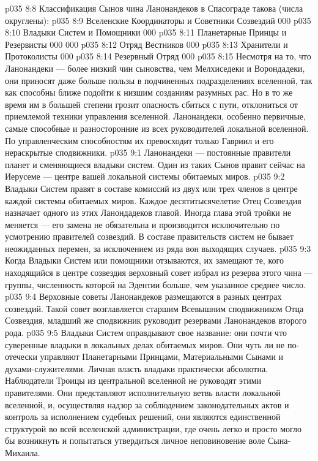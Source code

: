 \vs p035 8:8 Классификация Сынов чина Ланонандеков в Спасограде такова (числа округлены):
\vs p035 8:9 \pc Вселенские Координаторы и Советники Созвездий 000
\vs p035 8:10 Владыки Систем и Помощники 000
\vs p035 8:11 Планетарные Принцы и Резервисты 000 000
\vs p035 8:12 Отряд Вестников 000
\vs p035 8:13 Хранители и Протоколисты 000
\vs p035 8:14 Резервный Отряд 000
\vs p035 8:15 \pc Несмотря на то, что Ланонандеки --- более низкий чин сыновства, чем Мелхиседеки и Ворондадеки, они приносят даже больше пользы в подчиненных подразделениях вселенной, так как способны ближе подойти к низшим созданиям разумных рас. Но в то же время им в большей степени грозит опасность сбиться с пути, отклониться от приемлемой техники управления вселенной. Ланонандеки, особенно первичные, самые способные и разносторонние из всех руководителей локальной вселенной. По управленческим способностям их превосходит только Гавриил и его нераскрытые сподвижники.
\vs p035 9:1 Ланонандеки --- постоянные правители планет и сменяющиеся владыки систем. Один из таких Сынов правит сейчас на Иерусеме --- центре вашей локальной системы обитаемых миров.
\vs p035 9:2 Владыки Систем правят в составе комиссий из двух или трех членов в центре каждой системы обитаемых миров. Каждое десятитысячелетие Отец Созвездия назначает одного из этих Ланондадеков главой. Иногда глава этой тройки не меняется --- его замена не обязательна и производится исключительно по усмотрению правителей созвездий. В составе правительств систем не бывает неожиданных перемен, за исключением из ряда вон выходящих случаев.
\vs p035 9:3 Когда Владыки Систем или помощники отзываются, их замещают те, кого находящийся в центре созвездия верховный совет избрал из резерва этого чина --- группы, численность которой на Эдентии больше, чем указанное среднее число.
\vs p035 9:4 Верховные советы Ланонандеков размещаются в разных центрах созвездий. Такой совет возглавляется старшим Всевышним сподвижником Отца Созвездия, младший же сподвижник руководит резервами Ланонандеков второго рода.
\vs p035 9:5 \pc Владыки Систем оправдывают свое название: они почти что суверенные владыки в локальных делах обитаемых миров. Они чуть ли не по\hyp{}отечески управляют Планетарными Принцами, Материальными Сынами и духами\hyp{}служителями. Личная власть владыки практически абсолютна. Наблюдатели Троицы из центральной вселенной не руководят этими правителями. Они представляют исполнительную ветвь власти локальной вселенной, и, осуществляя надзор за соблюдением законодательных актов и контроль за исполнением судебных решений, они являются единственной структурой во всей вселенской администрации, где очень легко и просто могло бы возникнуть и попытаться утвердиться личное неповиновение воле Сына\hyp{}Михаила.

